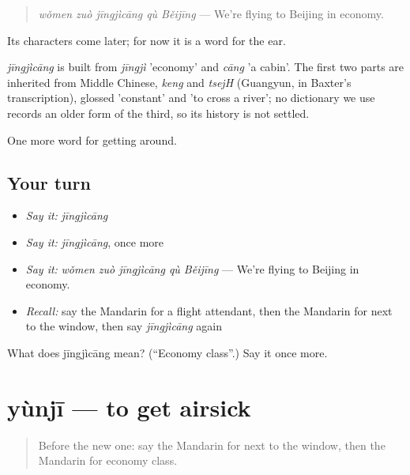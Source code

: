\begin{quote}
\emph{wǒmen zuò jīngjìcāng qù Běijīng} — We're flying to Beijing in economy.
\end{quote}

Its characters come later; for now it is a word for the ear.

\begin{cousinweb}
\emph{jīngjìcāng} is built from \emph{jīngjì} 'economy' and \emph{cāng} 'a cabin'. The first two parts are inherited from Middle Chinese, \emph{keng} and \emph{tsejH} (Guangyun, in Baxter's transcription), glossed 'constant' and 'to cross a river'; no dictionary we use records an older form of the third, so its history is not settled.
\end{cousinweb}

\begin{grammarlens}[title={What you've built}]
One more word for getting around.
\end{grammarlens}

\subsection*{Your turn}
\begin{itemize}
\raggedright
  \item \emph{Say it:} \emph{jīngjìcāng}
  \item \emph{Say it:} \emph{jīngjìcāng}, once more
  \item \emph{Say it:} \emph{wǒmen zuò jīngjìcāng qù Běijīng} — We're flying to Beijing in economy.
  \item \emph{Recall:} say the Mandarin for a flight attendant, then the Mandarin for next to the window, then say \emph{jīngjìcāng} again
\end{itemize}

\begin{tcolorbox}[breakable,colback=teal!4,colframe=teal!35!black,title={Before you move on}]
What does jīngjìcāng mean? (\textquotedblleft{}Economy class\textquotedblright{}.) Say it once more.
\end{tcolorbox}
\section[yùnjī]{yùnjī — to get airsick}

\label{lesson:ZH-C414-yunji}



\begin{quote}
Before the new one: say the Mandarin for next to the window, then the Mandarin for economy class.
\end{quote}

